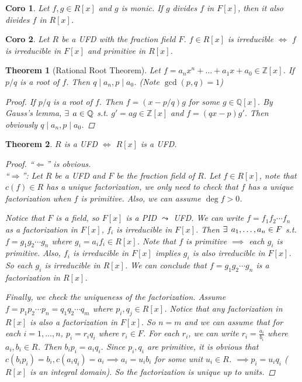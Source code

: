 \documentclass[a4paper]{article}
\let\existstemp\exists
\renewcommand*{\exists}{\existstemp\mkern4mu}
\newcommand{\Zb}{\mathbb{Z}}
\newcommand{\Qb}{\mathbb{Q}}
\theoremstyle{mystyle}
\newtheorem{theorem}{Theorem}
\newtheorem{coro}{Coro}
\begin{document}
\begin{coro}
  Let $f, g \in R[x]$ and $g$ is monic. If $g$ divides $f$ in $F[x]$, then
  it also divides $f$ in $R[x]$.
\end{coro}

\begin{coro}
  Let $R$ be a UFD with the fraction field $F$. $f \in R[x]$
  is irreducible $\iff$ $f$ is irreducible in $F[x]$ and primitive in $R[x]$.
\end{coro}

\begin{theorem}[Rational Root Theorem]
  Let $f = a_n x^n + \dots + a_1 x + a_0 \in \Zb[x]$.
  If $p/q$ is a root of $f$. Then $q \mid a_n, p \mid a_0$.
  (Note $\gcd(p, q) = 1$)
  \begin{proof}
    If $p/q$ is a root of $f$. Then $f = (x - p/q)g$ for some $g \in \Qb[x]$.
    By Gauss's lemma, $\exists a \in \Qb$ s.t. $g' = ag \in \Zb[x]$ and
    $f = (qx - p)g'$. Then obviously $q \mid a_n, p \mid a_0$.
  \end{proof}
\end{theorem}

\begin{theorem}
  $R$ is a UFD $\iff$ $R[x]$ is a UFD.
  \begin{proof}
    ``$\Leftarrow$'' is obvious. \\
    ``$\Rightarrow$'': Let $R$ be a UFD and $F$ be the fraction field of $R$.
    Let $f \in R[x]$, note that $c(f) \in R$ has a unique factorization,
    we only need to check that $f$ has a unique factorization when $f$ is primitive.
    Also, we can assume $\deg f > 0$.

    Notice that $F$ is a field, so $F[x]$ is a PID $\leadsto$ UFD.
    We can write $f = f_1f_2\dotsm f_n$ as a factorization in $F[x]$,
    $f_i$ is irreducible in $F[x]$.
    Then $\exists a_1, \dots, a_n \in F$ s.t.
    $f = g_1 g_2 \dotsm g_n$ where $g_i = a_if_i \in R[x]$.
    Note that $f$ is primitive $\implies$ each $g_i$ is primitive.
    Also, $f_i$ is irreducible in $F[x]$ implies $g_i$ is also irreducible in $F[x]$.
    So each $g_i$ is irreducible in $R[x]$.  We can conclude that 
    $f = g_1 g_2 \dotsm g_n$ is a factorization in $R[x]$.

    Finally, we check the uniqueness of the factorization. Assume
    $f = p_1p_2 \dotsm p_n = q_1q_2 \dotsm q_m$ where $p_i, q_j \in R[x]$.
    Notice that any factorization in $R[x]$ is also a factorization in $F[x]$.
    So $n = m$ and we can assume that for each $i = 1,\dots, n$,
    $p_i = r_i q_i$ where $r_i \in F$. For each $r_i$, we can write
    $r_i = \frac{a_i}{b_i}$ where $a_i, b_i \in R$. Then $b_i p_i = a_i q_i$.
    Since $p_i, q_i$ are primitive, it is obvious that
    $c(b_i p_i) = b_i, c(a_i q_i) = a_i \implies a_i = u_ib_i$ for some unit
    $u_i \in R$.  $\implies p_i = u_i q_i$ ($R[x]$ is an integral domain).
    So the factorization is unique up to units.
  \end{proof}
\end{theorem}
\end{document}

